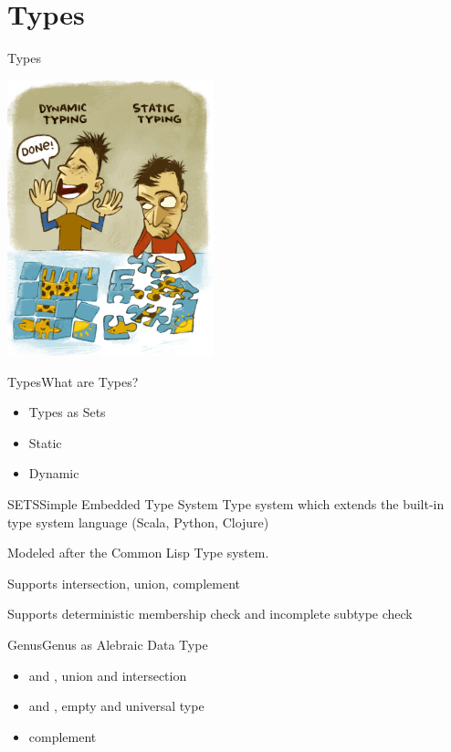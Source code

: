 \section{Types}
\begin{frame}{Types}
  \centering
  
    \includegraphics[height=8cm]{typing.png}
\end{frame}

\begin{frame}{Types}{What are Types?}
  \begin{itemize}
  \item Types as Sets
  \item Static
  \item Dynamic
  \end{itemize}
\end{frame}

\begin{frame}{SETS}{Simple Embedded Type System}
  Type system which extends the built-in type system language (Scala, Python, Clojure)

  Modeled after the Common Lisp Type system.

  Supports intersection, union, complement

  Supports deterministic membership check and incomplete subtype check

\end{frame}

\begin{frame}{Genus}{Genus as Alebraic Data Type}
  \begin{itemize}
  \item {} and , union and intersection
  \item {} and , empty and universal type
  \item {} complement
  \end{itemize}
\end{frame}

